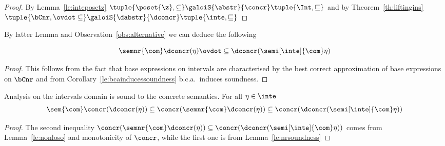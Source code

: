 \begin{proof}
  By Lemma~\ref{le:inteposetz}
  \(\tuple{\poset{\z}, \subseteq} \galoiS{\abstr}{\concr} \tuple{\Int,
    \sqsubseteq}\) and by Theorem~\ref{th:liftingins}
  \(\tuple{\bCnr, \ovdot\subseteq} \galoiS{\dabstr}{\dconcr}
  \tuple{\inte, \sqsubseteq}\)
\end{proof}

By latter Lemma and Observation~\ref{obs:alternative} we can deduce
the following

\begin{lemma}\label{le:nonloso}
  \begin{equation*}
    \semnr{\com}\dconcr(\eta) \ovdot\subseteq \dconcr(\semi[\inte]{\com}\eta)
  \end{equation*}
\end{lemma}

\begin{proof}
  This follows from the fact that base expressions on intervals are
  characterised by the best correct approximation of base expressions
  on \(\bCnr\) and from Corollary~\ref{le:bcainducessoundness} b.c.a.\
  induces soundness.
\end{proof}

\begin{observation}
  Analysis on the intervals domain is sound to the concrete
  semantics. For all \(\eta\in\inte\)
  \begin{equation*}
    \sem{\com}\concr(\dconcr(\eta)) \subseteq \concr(\semnr{\com}\dconcr(\eta)) \subseteq \concr(\dconcr(\semi[\inte]{\com}\eta))
  \end{equation*}
\end{observation}

\begin{proof}
  The second inequality
  \(\concr(\semnr{\com}\dconcr(\eta)) \subseteq
  \concr(\dconcr(\semi[\inte]{\com}\eta))\) comes from
  Lemma~\ref{le:nonloso} and monotonicity of \(\concr\), while the
  first one is from Lemma~\ref{le:nrsoundness}
\end{proof}
  
